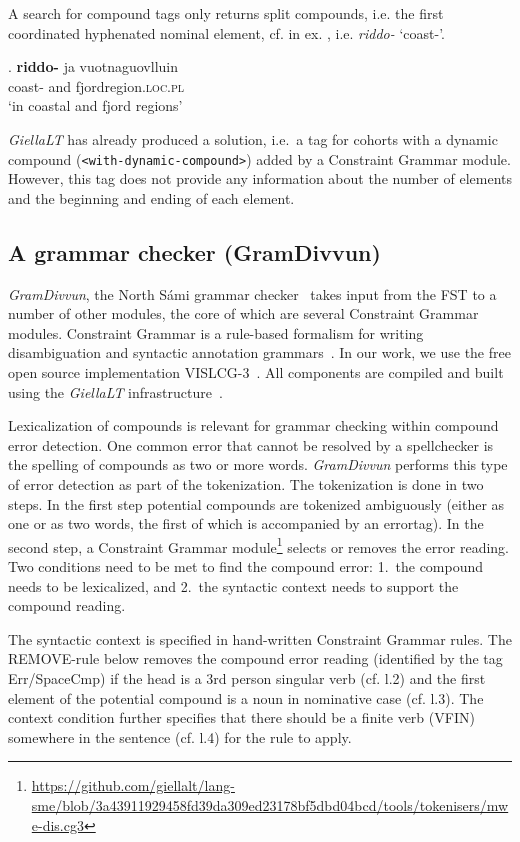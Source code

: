 \documentclass[free]{flammie}
\begin{document}
 A search for compound tags only returns split compounds,
 i.e. the first coordinated hyphenated nominal element, cf. in
 ex. \Next, i.e. \textit{riddo-} `coast-'.

 \exg. \textbf{riddo-} ja vuotnaguovlluin\label{split}\\
 coast- and fjordregion\textsc{.loc.pl}\\
 `in coastal and fjord regions'


\textit{GiellaLT} has already produced a solution, i.e.\ a tag for cohorts with
a dynamic compound (\texttt{<with-dynamic-compound>}) added by a Constraint Grammar module.
However, this tag does not provide any information
about the number of elements and the beginning and ending of each element.

\subsection{A grammar checker (GramDivvun)}

\textit{GramDivvun}, the
North Sámi grammar checker~\cite{Wiechetek2019} takes input from the FST to a number of other modules, the core of which are several Constraint Grammar modules.  Constraint Grammar
is a rule-based formalism for writing disambiguation and syntactic
annotation grammars~\cite{Karlsson:1990,Karlsson:1995}.
In our work, we use the free open source implementation VISLCG-3~\cite{Didriksen2015}. All components are compiled and built
using the \textit{GiellaLT}
infrastructure~\cite{Moshagen2013BuildingAO}.

Lexicalization of compounds is relevant for grammar checking within compound error detection. One common error that cannot be resolved by a spellchecker is the spelling of compounds as two or more words.
\textit{GramDivvun} performs this type of error detection as part of the tokenization.
The tokenization is done in two steps. In the first step potential compounds are tokenized ambiguously (either as one or as two words, the first of which is accompanied by an errortag). In the second step, a Constraint Grammar module\footnote{\url{https://github.com/giellalt/lang-sme/blob/3a43911929458fd39da309ed23178bf5dbd04bcd/tools/tokenisers/mwe-dis.cg3}} selects or removes the error reading.
Two conditions need to be met to find the compound error:
1.\ the compound needs to be lexicalized, and 2.\ the syntactic context needs to support the compound reading.

The syntactic context is specified in hand-written Constraint Grammar rules. The REMOVE-rule below removes the compound error reading (identified by the tag Err/SpaceCmp) if the head is a 3rd person singular verb (cf. l.2) and the first element of the potential compound is a noun in nominative case (cf. l.3). The context condition further specifies that there should be a finite verb (VFIN) somewhere in the sentence (cf. l.4) for the rule to apply.
\end{document}
